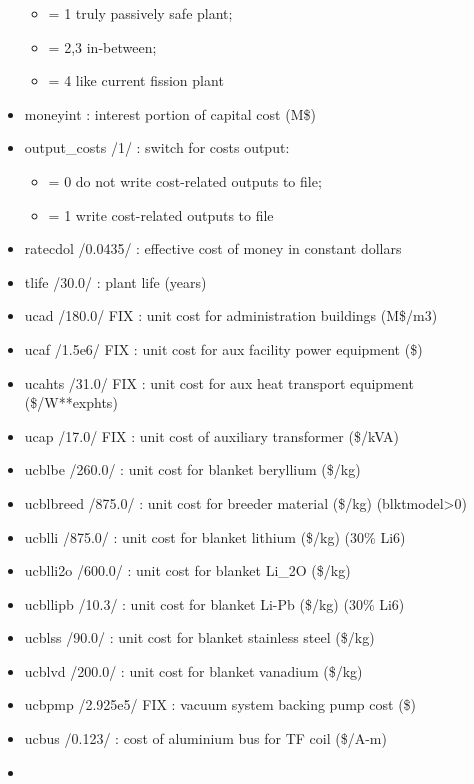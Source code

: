 \documentclass[]{article}
\providecommand{\tightlist}{%
  \setlength{\itemsep}{0pt}\setlength{\parskip}{0pt}}
\begin{document}
\begin{itemize}
  \begin{itemize}
  \tightlist
  \item
    = 1 truly passively safe plant;
  \item
    = 2,3 in-between;
  \item
    = 4 like current fission plant
  \end{itemize}
\item
  moneyint : interest portion of capital cost (M\$)
\item
  output\_costs /1/ : switch for costs output:

  \begin{itemize}
  \tightlist
  \item
    = 0 do not write cost-related outputs to file;
  \item
    = 1 write cost-related outputs to file
  \end{itemize}
\item
  ratecdol /0.0435/ : effective cost of money in constant dollars
\item
  tlife /30.0/ : plant life (years)
\item
  ucad /180.0/ FIX : unit cost for administration buildings (M\$/m3)
\item
  ucaf /1.5e6/ FIX : unit cost for aux facility power equipment (\$)
\item
  ucahts /31.0/ FIX : unit cost for aux heat transport equipment
  (\$/W**exphts)
\item
  ucap /17.0/ FIX : unit cost of auxiliary transformer (\$/kVA)
\item
  ucblbe /260.0/ : unit cost for blanket beryllium (\$/kg)
\item
  ucblbreed /875.0/ : unit cost for breeder material (\$/kg)
  (blktmodel\textgreater{}0)
\item
  ucblli /875.0/ : unit cost for blanket lithium (\$/kg) (30\% Li6)
\item
  ucblli2o /600.0/ : unit cost for blanket Li\_2O (\$/kg)
\item
  ucbllipb /10.3/ : unit cost for blanket Li-Pb (\$/kg) (30\% Li6)
\item
  ucblss /90.0/ : unit cost for blanket stainless steel (\$/kg)
\item
  ucblvd /200.0/ : unit cost for blanket vanadium (\$/kg)
\item
  ucbpmp /2.925e5/ FIX : vacuum system backing pump cost (\$)
\item
  ucbus /0.123/ : cost of aluminium bus for TF coil (\$/A-m)
\item

\end{itemize}
\end{document}
